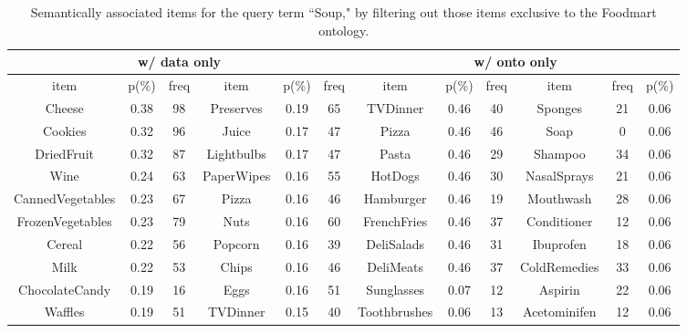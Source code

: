 


\begin{table}[tbh]\scriptsize
\begin{center}
\begin{tabular}{ c c c | c c c || c c c | c c c }
\hline
\multicolumn{6}{c||}{w/ data only}  &   \multicolumn{6}{c}{w/ onto only}\\
\hline
item	&	p(\%)	&	freq	&	item	&	p(\%)	&	freq	&	item	&	p(\%)	&	freq	&	item	&	freq	&	 p(\%)	 \\
\hline																							
Cheese	&	0.38	&	98	&	Preserves	&	0.19	&	65	&	TVDinner	&	0.46	&	40	&	Sponges	&	21	&	0.06	 \\
Cookies	&	0.32	&	96	&	Juice	&	0.17	&	47	&	Pizza	&	0.46	&	46	&	Soap	&	0	&	0.06	\\
DriedFruit	&	0.32	&	87	&	Lightbulbs	&	0.17	&	47	&	Pasta	&	0.46	&	29	&	Shampoo	&	34	&	0.06	 \\
Wine	&	0.24	&	63	&	PaperWipes	&	0.16	&	55	&	HotDogs	&	0.46	&	30	&	NasalSprays	&	21	&	0.06	 \\
CannedVegetables	&	0.23	&	67	&	Pizza	&	0.16	&	46	&	Hamburger	&	0.46	&	19	&	Mouthwash	&	28	 &	 0.06	 \\
FrozenVegetables	&	0.23	&	79	&	Nuts	&	0.16	&	60	&	FrenchFries	&	0.46	&	37	&	Conditioner	&	12	 &	 0.06	 \\
Cereal	&	0.22	&	56	&	Popcorn	&	0.16	&	39	&	DeliSalads	&	0.46	&	31	&	Ibuprofen	&	18	&	0.06	 \\
Milk	&	0.22	&	53	&	Chips	&	0.16	&	46	&	DeliMeats	&	0.46	&	37	&	ColdRemedies	&	33	&	 0.06	 \\
ChocolateCandy	&	0.19	&	16	&	Eggs	&	0.16	&	51	&	Sunglasses	&	0.07	&	12	&	Aspirin	&	22	&	 0.06	 \\
Waffles	&	0.19	&	51	&	TVDinner	&	0.15	&	40	&	Toothbrushes	&	0.06	&	13	&	Acetominifen	&	12	 &	 0.06	 \\
\hline
\end{tabular}
\end{center}
\caption[Top results on the Foodmart dataset excluding concepts only in the ontology.]{\label{tbl:foodmart_comp2} Semantically associated items  for the query term ``Soup," by filtering out those items exclusive to the Foodmart ontology.}
\end{table}


